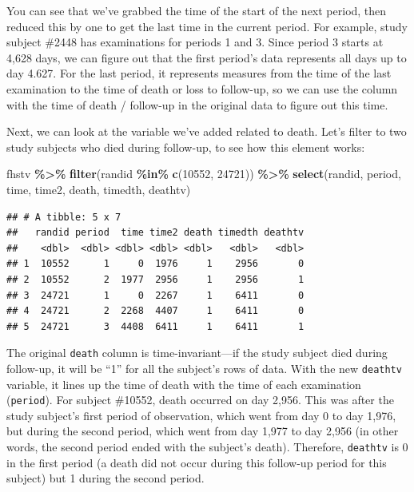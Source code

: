 \documentclass[
]{book}
\newenvironment{Shaded}{\begin{snugshade}}{\end{snugshade}}
\newcommand{\DecValTok}[1]{\textcolor[rgb]{0.00,0.00,0.81}{#1}}
\newcommand{\FunctionTok}[1]{\textcolor[rgb]{0.13,0.29,0.53}{\textbf{#1}}}
\newcommand{\NormalTok}[1]{#1}
\newcommand{\SpecialCharTok}[1]{\textcolor[rgb]{0.81,0.36,0.00}{\textbf{#1}}}
\begin{document}
You can see that we've grabbed the time of the start of the next period, then reduced this by one to get the last time in the current period. For example, study subject \#2448 has examinations for periods 1 and 3. Since period 3 starts at 4,628 days, we can figure out that the first period's data represents all days up to day 4.627. For the last period, it represents measures from the time of the last examination to the time of death or loss to follow-up, so we can use the column with the time of death / follow-up in the original data to figure out this time.

Next, we can look at the variable we've added related to death. Let's filter to two study subjects who died during follow-up, to see how this element works:

\begin{Shaded}
\begin{Highlighting}[]
\NormalTok{fhstv }\SpecialCharTok{\%\textgreater{}\%} 
  \FunctionTok{filter}\NormalTok{(randid }\SpecialCharTok{\%in\%} \FunctionTok{c}\NormalTok{(}\DecValTok{10552}\NormalTok{, }\DecValTok{24721}\NormalTok{)) }\SpecialCharTok{\%\textgreater{}\%} 
  \FunctionTok{select}\NormalTok{(randid, period, time, time2, death, timedth, deathtv)}
\end{Highlighting}
\end{Shaded}

\begin{verbatim}
## # A tibble: 5 x 7
##   randid period  time time2 death timedth deathtv
##    <dbl>  <dbl> <dbl> <dbl> <dbl>   <dbl>   <dbl>
## 1  10552      1     0  1976     1    2956       0
## 2  10552      2  1977  2956     1    2956       1
## 3  24721      1     0  2267     1    6411       0
## 4  24721      2  2268  4407     1    6411       0
## 5  24721      3  4408  6411     1    6411       1
\end{verbatim}

The original \texttt{death} column is time-invariant---if the study subject died during follow-up, it will be ``1'' for all the subject's rows of data. With the new \texttt{deathtv} variable, it lines up the time of death with the time of each examination (\texttt{period}). For subject \#10552, death occurred on day 2,956. This was after the study subject's first period of observation, which went from day 0 to day 1,976, but during the second period, which went from day 1,977 to day 2,956 (in other words, the second period ended with the subject's death). Therefore, \texttt{deathtv} is 0 in the first period (a death did not occur during this follow-up period for this subject) but 1 during the second period.
\end{document}

